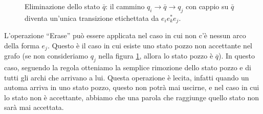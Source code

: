 \begin{itemize}
\begin{figure}[H]
\caption{Eliminazione dello stato $\bar q$: il cammino $q_i \to \bar q \to q_j$ con cappio su $\bar q$ diventa un'unica transizione etichettata da $e_i e_k^* e_j$.}
\label{fig:erase}
\end{figure}
\end{itemize}

\begin{rema}
    L'operazione ``Erase'' può essere applicata
    nel caso in cui non c'è nessun arco della forma $e_j$.
    Questo è il caso in cui
    esiste uno stato pozzo non accettante 
    nel grafo
    (se non consideriamo
    $q_j$ nella figura \ref{fig:erase}, allora
    lo stato pozzo è $\overline{q}$).
    In questo caso, seguendo la regola
    otteniamo la semplice rimozione dello
    stato pozzo
    e di tutti gli archi che arrivano a lui.
    Questa operazione è lecita,
    infatti quando un automa arriva in uno stato pozzo,
    questo non potrà mai uscirne, e nel caso 
    in cui lo stato non è accettante,
    abbiamo che una parola che raggiunge
    quello stato non sarà mai accettata.
\end{rema}

